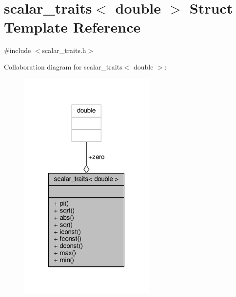 \hypertarget{structscalar__traits_3_01double_01_4}{\section{scalar\-\_\-traits$<$ double $>$ Struct Template Reference}
\label{structscalar__traits_3_01double_01_4}
}


{\ttfamily \#include $<$scalar\-\_\-traits.\-h$>$}



Collaboration diagram for scalar\-\_\-traits$<$ double $>$\-:
\nopagebreak
\begin{figure}[H]
\begin{center}
\leavevmode
\includegraphics[width=194pt]{structscalar__traits_3_01double_01_4__coll__graph}
\end{center}
\end{figure}
